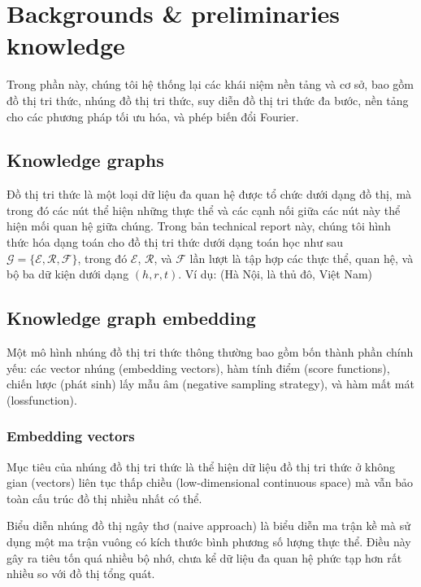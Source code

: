 \section{Backgrounds \& preliminaries knowledge}

Trong phần này, chúng tôi hệ thống lại các khái niệm nền tảng và cơ sở, bao gồm đồ thị tri thức, nhúng đồ thị tri thức, suy diễn đồ thị tri thức đa bước, nền tảng cho các phương pháp tối ưu hóa, và phép biến đổi Fourier.

\subsection{Knowledge graphs}

Đồ thị tri thức là một loại dữ liệu đa quan hệ được tổ chức dưới dạng đồ thị, mà trong đó các nút thể hiện những thực thể và các cạnh nối giữa các nút này thể hiện mối quan hệ giữa chúng. Trong bản technical report này, chúng tôi hình thức hóa dạng toán cho đồ thị tri thức dưới dạng toán học như sau $\mathcal{G} = \{\mathcal{E}, \mathcal{R}, \mathcal{F}\}$, trong đó $\mathcal{E}$, $\mathcal{R}$, và $\mathcal{F}$ lần lượt là tập hợp các thực thể, quan hệ, và bộ ba dữ kiện dưới dạng $(h, r, t)$. Ví dụ: (Hà Nội, là thủ đô, Việt Nam)


\subsection{Knowledge graph embedding}

Một mô hình nhúng đồ thị tri thức thông thường bao gồm bốn thành phần chính yếu: các vector nhúng (embedding vectors), hàm tính điểm (score functions), chiến lược (phát sinh) lấy mẫu âm (negative sampling strategy), và hàm mất mát (lossfunction).

\subsubsection{Embedding vectors}

Mục tiêu của nhúng đồ thị tri thức là thể hiện dữ liệu đồ thị tri thức ở không gian (vectors) liên tục thấp chiều (low-dimensional continuous space) mà vẫn bảo toàn cấu trúc đồ thị nhiều nhất có thể.

Biểu diễn nhúng đồ thị ngây thơ (naive approach) là biểu diễn ma trận kề mà sử dụng một ma trận vuông có kích thước bình phương số lượng thực thể. Điều này gây ra tiêu tốn quá nhiều bộ nhớ, chưa kể dữ liệu đa quan hệ phức tạp hơn rất nhiều so với đồ thị tổng quát.

